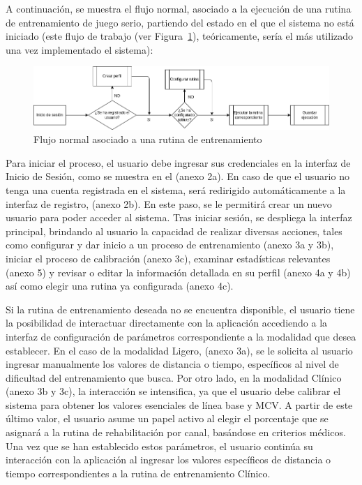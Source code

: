 A continuación, se muestra el flujo normal, asociado a la ejecución de una rutina de entrenamiento de juego serio, partiendo del estado en el que el sistema no está iniciado (este flujo de trabajo (ver Figura~\ref{fig: diagram-flow}), teóricamente, sería el más utilizado una vez implementado el sistema):

\begin{figure}[ht]
    \centering
    \includegraphics[scale=0.5]{images/diagram-flow.png}
    \caption{Flujo normal asociado a una rutina de entrenamiento}
    \label{fig: diagram-flow}
\end{figure}

\newpage
Para iniciar el proceso, el usuario debe ingresar sus credenciales en la interfaz de Inicio de Sesión, como se muestra en el (anexo 2a). En caso de que el usuario no tenga una cuenta registrada en el sistema, será redirigido automáticamente a la interfaz de registro, (anexo 2b). En este paso, se le permitirá crear un nuevo usuario para poder acceder al sistema. Tras iniciar sesión, se despliega la interfaz principal, brindando al usuario la capacidad de realizar diversas acciones, tales como configurar y dar inicio a un proceso de entrenamiento (anexo 3a y 3b), iniciar el proceso de calibración (anexo 3c), examinar estadísticas relevantes (anexo 5) y revisar o editar la información detallada en su perfil (anexo 4a y 4b) así como elegir una rutina ya configurada (anexo 4c).

Si la rutina de entrenamiento deseada no se encuentra disponible, el usuario tiene la posibilidad de interactuar directamente con la aplicación accediendo a la interfaz de configuración de parámetros correspondiente a la modalidad que desea establecer. En el caso de la modalidad Ligero, (anexo 3a), se le solicita al usuario ingresar manualmente los valores de distancia o tiempo, específicos al nivel de dificultad del entrenamiento que busca. Por otro lado, en la modalidad Clínico (anexo 3b y 3c), la interacción se intensifica, ya que el usuario debe calibrar el sistema para obtener los valores esenciales de línea base y MCV. A partir de este último valor, el usuario asume un papel activo al elegir el porcentaje que se asignará a la rutina de rehabilitación por canal, basándose en criterios médicos. Una vez que se han establecido estos parámetros, el usuario continúa su interacción con la aplicación al ingresar los valores específicos de distancia o tiempo correspondientes a la rutina de entrenamiento Clínico. 

